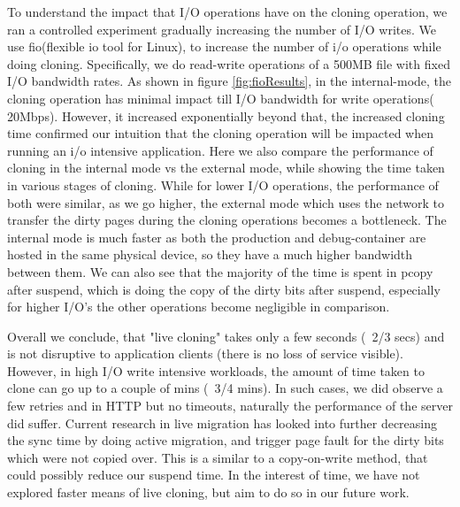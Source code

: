 To understand the impact that I/O operations have on the cloning operation, we ran a controlled experiment gradually increasing the number of I/O writes. 
We use fio(flexible io tool for Linux)\cite{fio}, to increase the number of i/o operations while doing cloning. 
Specifically, we do read-write operations of a 500MB file with fixed I/O bandwidth rates.
As shown in figure \ref{fig:fioResults}, in the internal-mode, the cloning operation has minimal impact till I/O bandwidth for write operations(~ 20Mbps). 
However, it increased exponentially beyond that, the increased cloning time confirmed our intuition that the cloning operation will be impacted when running an i/o intensive application.
Here we also compare the performance of cloning in the internal mode vs the external mode, while showing the time taken in various stages of cloning.
While for lower I/O operations, the performance of both were similar, as we go higher, the external mode which uses the network to transfer the dirty pages during the cloning operations becomes a bottleneck. 
The internal mode is much faster as both the production and debug-container are hosted in the same physical device, so they have a much higher bandwidth between them.
We can also see that the majority of the time is spent in pcopy after suspend, which is doing the copy of the dirty bits after suspend, especially for higher I/O's the other operations become negligible in comparison.

Overall we conclude, that "live cloning" takes only a few seconds (~2/3 secs) and is not disruptive to application clients (there is no loss of service visible). 
However, in high I/O write intensive workloads, the amount of time taken to clone can go up to a couple of mins (~3/4 mins).
In such cases, we did observe a few retries and in HTTP but no timeouts, naturally the performance of the server did suffer. 
Current research in live migration has looked into further decreasing the sync time by doing active migration, and trigger page fault for the dirty bits which were not copied over.
This is a similar to a copy-on-write method, that could possibly reduce our suspend time.
In the interest of time, we have not explored faster means of live cloning, but aim to do so in our future work.

